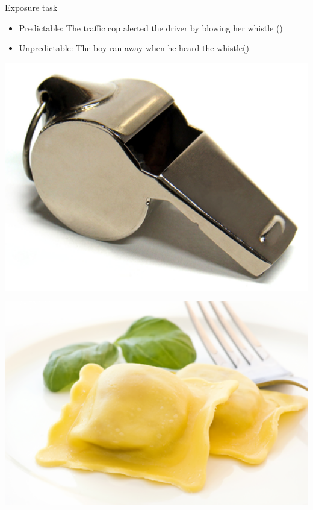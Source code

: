 \documentclass{beamer}
\begin{document}
\begin{frame}{Exposure task}
\begin{itemize}
\item Predictable: The traffic cop alerted the driver by blowing her whistle () 
\item Unpredictable: The boy ran away when he heard the whistle()
\end{itemize}
\begin{minipage}[t]{0.45\textwidth}
\includegraphics[width=1.0\textwidth]{pictures/whistle}
\end{minipage}
\hfill
\begin{minipage}[t]{0.45\textwidth}
\includegraphics[width=1.0\textwidth]{pictures/ravioli}
\end{minipage}
\end{frame}
\end{document}
